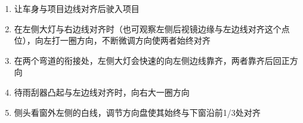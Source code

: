 \begin{enumerate}
    \item 让车身与项目边线对齐后驶入项目
    \item 在左侧大灯与右边线对齐时（也可观察左侧后视镜边缘与左边线对齐这个点位），向左打一圈方向，不断微调方向使两者始终对齐
    \item 在两个弯道的衔接处，左侧大灯会快速的向左侧边线靠齐，两者靠齐后回正方向
    \item 待雨刮器凸起与左边线对齐时，向右大一圈方向
    \item 侧头看窗外左侧的白线，调节方向盘使其始终与下窗沿前1/3处对齐
\end{enumerate}